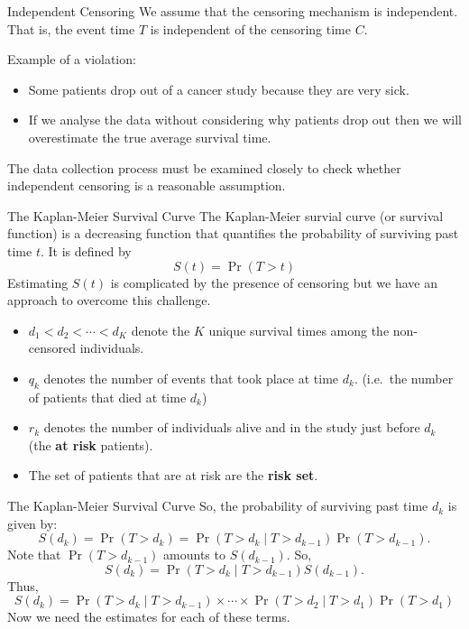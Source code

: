 \documentclass[
  ignorenonframetext,
  aspectratio=169,
]{beamer}
\begin{document}
\begin{frame}{Independent Censoring}
\protect\hypertarget{independent-censoring}{}
We assume that the censoring mechanism is independent. That is, the
\alert{event time $T$ is independent of the censoring time $C$}.

Example of a violation:

\begin{itemize}
\item
  Some patients drop out of a cancer study because they are very sick.
\item
  If we analyse the data without considering why patients drop out then
  we will overestimate the true average survival time.
\end{itemize}

The data collection process must be examined closely to check whether
independent censoring is a reasonable assumption.
\end{frame}

\begin{frame}{The Kaplan-Meier Survival Curve}
\protect\hypertarget{the-kaplan-meier-survival-curve}{}
The Kaplan-Meier survial curve (or survival function) is a decreasing
function that
\alert{quantifies the probability of surviving past time $t$}. It is
defined by \[S(t)=\operatorname{Pr}(T>t)\] Estimating \(S(t)\) is
complicated by the presence of censoring but we have an approach to
overcome this challenge.

\begin{itemize}
\item
  \(d_{1}<d_{2}<\cdots<d_{K}\) denote the \(K\) unique survival times
  among the non-censored individuals.
\item
  \(q_k\) denotes the number of events that took place at time \(d_k\).
  (i.e.~the number of patients that died at time \(d_k\))
\item
  \(r_k\) denotes the number of individuals alive and in the study just
  before \(d_k\) (the \textbf{at risk} patients).
\item
  The set of patients that are at risk are the \textbf{risk set}.
\end{itemize}
\end{frame}

\begin{frame}{The Kaplan-Meier Survival Curve}
\protect\hypertarget{the-kaplan-meier-survival-curve-1}{}
So, the probability of surviving past time \(d_k\) is given by: \[
S\left(d_{k}\right)=\operatorname{Pr}\left(T>d_{k}\right)=\operatorname{Pr}\left(T>d_{k} \mid T>d_{k-1}\right) \operatorname{Pr}\left(T>d_{k-1}\right).
\] Note that \(\operatorname{Pr}\left(T>d_{k-1}\right)\) amounts to
\(S\left(d_{k-1}\right)\). So,
\[S\left(d_{k}\right)=\operatorname{Pr}\left(T>d_{k} \mid T>d_{k-1}\right) S\left(d_{k-1}\right).\]
Thus, \[
S\left(d_{k}\right)=\operatorname{Pr}\left(T>d_{k} \mid T>d_{k-1}\right) \times \cdots \times \operatorname{Pr}\left(T>d_{2} \mid T>d_{1}\right) \operatorname{Pr}\left(T>d_{1}\right)
\] Now we need the estimates for each of these terms.
\end{frame}
\end{document}
